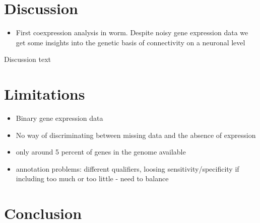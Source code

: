 \documentclass[10pt,letterpaper]{article}
\begin{document}
%
%
%
%
%

\section*{Discussion}
\begin{itemize}
    \item{First coexpression analysis in worm. Despite noisy gene expression data we get some insights into the genetic basis of connectivity on a neuronal level}
\end{itemize} 
Discussion text
\section*{Limitations}

\begin{itemize}
    \item{Binary gene expression data}
    \item{No way of discriminating between missing data and the absence of expression}
    \item{only around 5 percent of genes in the genome available}
    \item{annotation problems: different qualifiers, loosing sensitivity/specificity if including too much or too little - need to balance}

\end{itemize} 

\section*{Conclusion}
\end{document}
